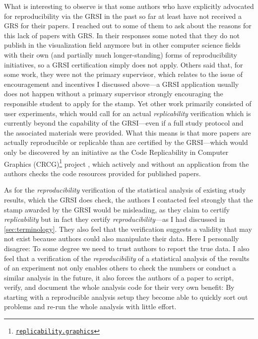 \documentclass[conference]{vgtc}                     %
\begin{document}
What is interesting to observe is that some authors who have explicitly advocated for reproducibility via the GRSI in the past so far at least have not received a GRS for their papers. I reached out to some of them to ask about the reasons for this lack of papers with GRS. In their responses some noted that they do not publish in the visualization field anymore but in other computer science fields with their own (and partially much lon\-ger-stan\-ding) forms of reproducibility initiatives, so a GRSI certification simply does not apply. Others said that, for some work, they were not the primary supervisor, which relates to the issue of encouragement and incentives I discussed above---a GRSI application usually does not happen without a primary supervisor strongly encouraging the responsible student to apply for the stamp. Yet other work primarily consisted of user experiments, which would call for an actual \emph{replicability} verification which is currently beyond the capability of the GRSI---even if a full study protocol and the associated materials were provided. What this means is that more papers are actually reproducible or replicable than are certified by the GRSI---which would only be discovered by an initiative as the Code Replicability in Computer Graphics (CRCG)\footnote{\href{https://replicability.graphics/}{\texttt{replicability.graphics}}} project \cite{Bonneel:2020:CRC}, which actively and without an application from the authors checks the code resources provided for published papers.

As for the \emph{reproducibility} verification of the statistical analysis of existing study results, which the GRSI does check, the authors I contacted feel strongly that the stamp awarded by the GRSI would be misleading, as they claim to certify \emph{replicability} but in fact they certify \emph{reproducibility}---as I had discussed in \autoref{sec:terminology}. They also feel that the verification suggests a validity that may not exist because authors could also manipulate their data. Here I personally disagree: To some degree we need to trust authors to report the true data. I also feel that a verification of the \emph{reproducibility} of a statistical analysis of the results of an experiment not only enables others to check the numbers or conduct a similar analysis in the future, it also forces the authors of a paper to script, verify, and document the whole analysis code for their very own benefit: By starting with a reproducible analysis setup they become able to quickly sort out problems and re-run the whole analysis with little effort.
\end{document}
